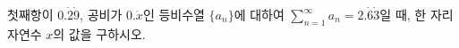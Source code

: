 첫째항이 $0.\dot{2}\dot{9}$, 공비가 $0.\dot{x}$인 등비수열 $\{a_n\}$에 대하여 $\displaystyle\sum_{n=1}^{\infty}a_n=2.\dot{6}\dot{3}$일 때, 한 자리 자연수 $x$의 값을 구하시오.
